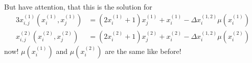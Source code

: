 But have attention, that this is the solution for 
\begin{alignat}{3}
	x_{i,j}^{\left(1\right)}\left(x_{i}^{\left(1\right)}, x_{j}^{\left(1\right)}\right) &= \left(2x_{i}^{\left(1\right)} + 1\right)x_{j}^{\left(1\right)} + x_{i}^{\left(1\right)} - \Delta x_{i}^{\left(1,2\right)}\mu\left(x_{i}^{\left(1\right)}\right) \label{eq:xijeq_new1} \\
	x_{i,j}^{\left(2\right)}\left(x_{i}^{\left(2\right)}, x_{j}^{\left(2\right)}\right) &= \left(2x_{i}^{\left(2\right)} + 1\right)x_{j}^{\left(2\right)} + x_{i}^{\left(2\right)} - \Delta x_{i}^{\left(1,2\right)}\mu\left(x_{i}^{\left(2\right)}\right) \label{eq:xijeq_new2}
\end{alignat}
now! $\mu\left(x_{i}^{\left(1\right)}\right)$ and $\mu\left(x_{i}^{\left(2\right)}\right)$ are the same like before!



















